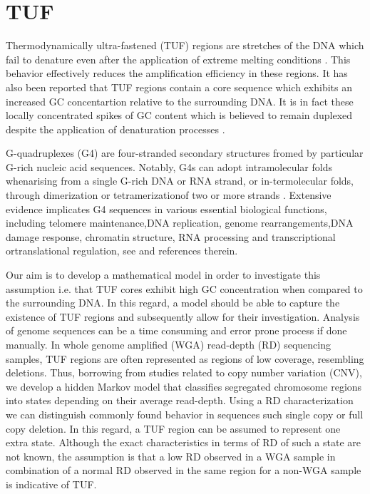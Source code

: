 
\section{TUF}
\label{tuf}

Thermodynamically ultra-fastened (TUF) regions are stretches of the DNA which fail to denature
even after the application of extreme melting conditions \cite{veal2012}. 
This behavior effectively reduces the amplification efficiency in these regions. It has also been reported that 
TUF regions contain a core sequence which exhibits an increased GC concentartion relative to the
surrounding DNA. It is in fact these locally concentrated spikes of GC content which is believed
to remain duplexed despite the application of denaturation processes \cite{veal2012}. 

G-quadruplexes (G4) are four-stranded secondary structures fromed by particular G-rich nucleic acid sequences.
Notably, G4s can adopt intramolecular folds whenarising from a single G-rich DNA or RNA strand, or in-termolecular folds, through dimerization or tetramerizationof two or more strands \cite{lombardi2020}.
Extensive evidence implicates G4 sequences in various essential biological functions, including telomere maintenance,DNA replication, genome rearrangements,DNA damage response, chromatin structure, RNA processing and transcriptional ortranslational regulation, see \cite{lombardi2020} and references therein. 

Our aim is to develop a mathematical model in order to investigate this assumption i.e. that
TUF cores exhibit high GC concentration when compared to the surrounding DNA. In this regard, a model
should be able to capture the existence of TUF regions and subsequently allow for their investigation. 
Analysis of genome sequences can be a time consuming and error prone process if done manually.
In whole genome amplified (WGA) read-depth (RD) sequencing samples, TUF regions are often represented as regions of low coverage, resembling deletions. 
Thus,  borrowing from studies related to copy number variation (CNV),  we develop a hidden Markov model that classifies segregated chromosome regions into states depending on their average read-depth. Using a RD characterization we can distinguish commonly found behavior in sequences such single copy or full copy deletion.
In this regard, a TUF region can be assumed to represent one extra state. Although the exact characteristics in terms of RD of such a state are not known, the assumption is that a low RD observed in a WGA sample in combination of a normal RD observed in the same region for a non-WGA sample is indicative of TUF. 


